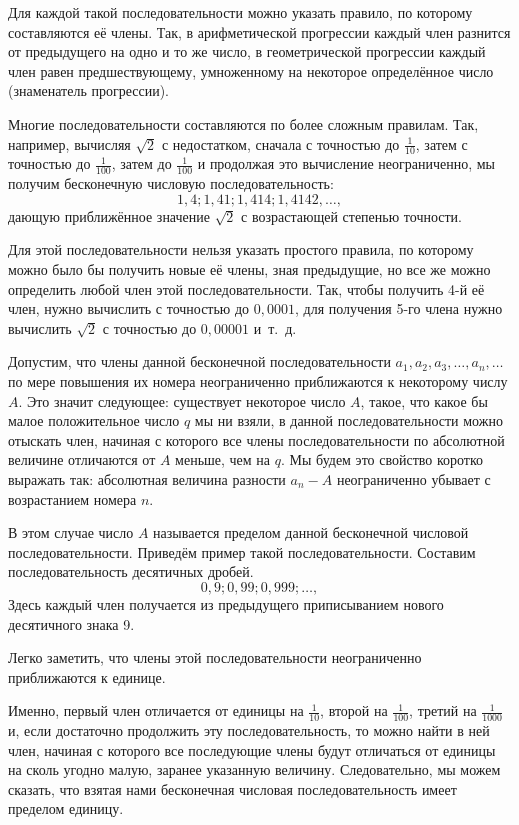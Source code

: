 \documentclass[twoside]{book}
\begin{document}
Для каждой такой последовательности можно указать правило, по которому составляются её члены.
Так, в арифметической прогрессии каждый член разнится от предыдущего на одно и то же число, в геометрической прогрессии каждый член равен предшествующему, умноженному на некоторое определённое число (знаменатель прогрессии).

Многие последовательности составляются по более сложным правилам.
Так, например, вычисляя $\sqrt{2}$ с недостатком, сначала с точностью до $\tfrac1{10}$, затем с точностью до $\tfrac1{100}$, затем до $\tfrac1{100}$ и продолжая это вычисление неограниченно, мы получим бесконечную числовую последовательность:
\[1{,}4;
1{,}41;
1{,}414;
1{,}4142,\dots,\]
дающую приближённое значение  $\sqrt{2}$  с возрастающей степенью точности.

Для этой последовательности нельзя указать простого правила, по которому можно было бы получить новые её члены, зная предыдущие, но все же можно определить любой член этой последовательности.
Так, чтобы получить 4-й её член, нужно вычислить с точностью до $0{,}0001$, для получения 5-го члена нужно вычислить  $\sqrt{2}$  с точностью до $0{,}00001$ и~т.~д.

Допустим, что члены данной бесконечной последовательности $a_1, a_2, a_3, \dots, a_n,\dots$ по мере повышения их номера неограниченно приближаются к некоторому числу $A$.
Это значит следующее:
существует некоторое число $A$, такое, что какое бы малое положительное число $q$ мы ни взяли, в данной последовательности можно отыскать член, начиная с которого все члены последовательности по абсолютной величине отличаются от $A$ меньше, чем на $q$.
Мы будем это свойство коротко выражать так:
 абсолютная величина разности $a_n-A$
неограниченно убывает с возрастанием номера $n$.

В этом случае число $A$ называется пределом данной бесконечной числовой последовательности.
Приведём пример такой последовательности.
Составим последовательность десятичных дробей.
\[0{,}9;
0{,}99;
0{,}999;\dots,\]
Здесь каждый член получается из предыдущего приписыванием нового десятичного знака 9.

Легко заметить, что члены этой последовательности неограниченно приближаются к единице.

Именно, первый член отличается от единицы на $\tfrac1{10}$, 
второй на $\tfrac1{100}$, третий на $\tfrac1{1000}$ и, если достаточно продолжить эту последовательность, то можно найти в ней член, начиная с которого все последующие члены будут отличаться от единицы на сколь угодно малую, заранее указанную величину.
Следовательно, мы можем сказать, что взятая нами бесконечная числовая последовательность имеет пределом единицу.
\end{document}
